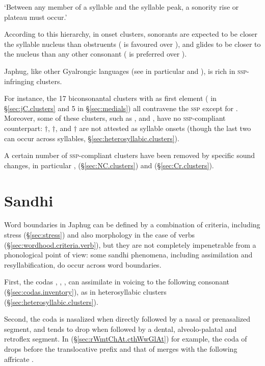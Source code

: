 \begin{exe}
	\ex \label{ex:ssp}
	\glt `Between any member of a syllable and the syllable peak, a sonority
	rise or plateau must occur.'
\end{exe}

According to this hierarchy, in onset clusters, sonorants are expected to be closer the syllable nucleus than obstruents ( is favoured over ), and glides to be closer to the nucleus than any other consonant ( is preferred over ).

Japhug, like other Gyalrongic languages (see in particular \citealt{jackson00puxi} and \citealt[73]{lai17khroskyabs}), is rich in \textsc{ssp}-infringing clusters. 


For instance, the 17 biconsonantal clusters with  as first element ( in §\ref{sec:jC.clusters} and 5 in §\ref{sec:medials}) all contravene the \textsc{ssp} except for . Moreover, some of these clusters, such as ,  and , have no \textsc{ssp}-compliant counterpart: $\dagger$, $\dagger$,  and $\dagger$ are not attested as syllable onsets (though the last two can occur across syllables, §\ref{sec:heterosyllabic.clusters}). 

A certain number of \textsc{ssp}-compliant clusters have been removed by specific sound changes, in particular  \fl{} ,  \fl{}  (§\ref{sec:NC.clusters}) and   \fl{}  (§\ref{sec:Cr.clusters}).


\section{Sandhi} \label{sec:sandhi.word}
Word boundaries in Japhug can be defined by a combination of criteria, including stress (§\ref{sec:stress}) and also morphology in the case of verbs (§\ref{sec:wordhood.criteria.verb}), but they are not completely impenetrable from a phonological point of view: some sandhi phenomena, including assimilation and resyllabification, do occur across word boundaries.

First, the codas ,  , ,  can assimilate in voicing to the following consonant (§\ref{sec:codas.inventory}), as in heterosyllabic clusters (§\ref{sec:heterosyllabic.clusters}).

Second, the coda  is nasalized when directly followed by a nasal or prenasalized segment, and tends to drop when followed by a dental, alveolo-palatal and retroflex segment. In (§\ref{sec:rWmtChAt.cthWwGlAt}) for example, the  coda of  drops before the  translocative prefix and that of  merges with the following affricate .

